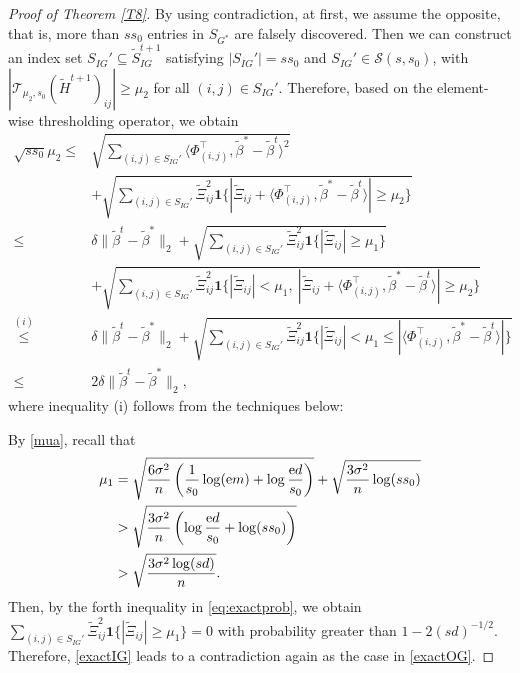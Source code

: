 \documentclass[12pt]{article}
\newtheorem{proof}{Proof}
\begin{document}
\begin{appendix}
\begin{proof}[Proof of Theorem \ref{T8}]
By using contradiction, at first, we assume the opposite, that is, more than $ss_0$ entries in $S_{G^*}$ are falsely discovered. 
Then we can construct an index set $S_{IG}' \subseteq \tilde S_{IG}^{t+1}$ satisfying $|S_{IG}'| =ss_0$ and $S_{IG}' \in \mathcal S(s,s_0)$, with $|\mathcal T_{\mu_2,s_0} (\tilde H^{t+1})_{ij}| \ge \mu_2$ for all $ (i,j) \in S_{IG}'$. 
Therefore, based on the element-wise thresholding operator, we obtain 
\begin{equation}\label{exactIG}
   \begin{aligned}
    \sqrt{ss_0}\mu_2
    \le & \sqrt{\sum_{(i,j) \in S_{IG}'} \langle{\Phi}_{(i,j)}^\top, \tilde\beta^* - \tilde\beta^{t} \rangle^2 } \\
        &+\sqrt{\sum_{(i,j)\in S_{IG}'}\tilde\Xi_{ij}^2 \mathbf1\Big\{ |\tilde\Xi_{ij}+\langle{\Phi}_{(i,j)}^\top, \tilde\beta^* - \tilde\beta^{t} \rangle|\ge \mu_2 \Big\} }\\
    \le & \delta \|\tilde \beta^t - \tilde\beta^* \|_2
        +\sqrt{\sum_{(i,j)\in S_{IG}'}\tilde\Xi_{ij}^2 \mathbf1\Big\{ |\tilde\Xi_{ij}|\ge \mu_1\Big\} }\\ 
        &+\sqrt{\sum_{(i,j)\in S_{IG}'}\tilde\Xi_{ij}^2 \mathbf1\Big\{ |\tilde\Xi_{ij}|<\mu_1,~|\tilde\Xi_{ij}+ \langle{\Phi}_{(i,j)}^\top, \tilde\beta^* - \tilde\beta^{t} \rangle |\ge \mu_2 \Big\} }\\
    \overset{(i)}{\le}&  \delta \|\tilde \beta^t - \tilde\beta^* \|_2 +\sqrt{\sum_{(i,j)\in S_{IG}'}\tilde\Xi_{ij}^2 \mathbf1\Big\{ |\tilde\Xi_{ij}|<\mu_1 \le |\langle{\Phi}_{(i,j)}^\top, \tilde\beta^* - \tilde\beta^{t} \rangle|\Big\} }\\
    \le & 2 \delta \|\tilde \beta^t - \tilde\beta^* \|_2 ,
\end{aligned}
\end{equation}
where inequality (i) follows from the techniques below: 

By \eqref{mua}, recall that
\begin{align*}
\mu_1
&=  \sqrt{ \frac{6\sigma^2}{n} \left( \frac{1}{s_0}\log({\rm e} m ) + \log\frac{{\rm e} d}{s_0} \right)  }  + \sqrt{ \frac{3\sigma^2}{n} \log(ss_0) } \\ 
&> \sqrt{ \frac{3\sigma^2}{n} \left( \log\frac{{\rm e} d}{s_0} + \log(ss_0) \right)  } \\
&>\sqrt{ \frac{3\sigma^2 \log(sd)}{n}  }.
\end{align*}
Then, by the forth inequality in \eqref{eq:exactprob}, we obtain $ \sum_{(i,j)\in S_{IG}'}\tilde\Xi_{ij}^2 \mathbf1\Big\{ |\tilde\Xi_{ij}|\ge \mu_1\Big\} =0$ with probability greater than $1 - 2(sd)^{-1/2}$. 
Therefore, \eqref{exactIG} leads to a contradiction again as the case in \eqref{exactOG}.



\end{proof}
\end{appendix}
\end{document}
